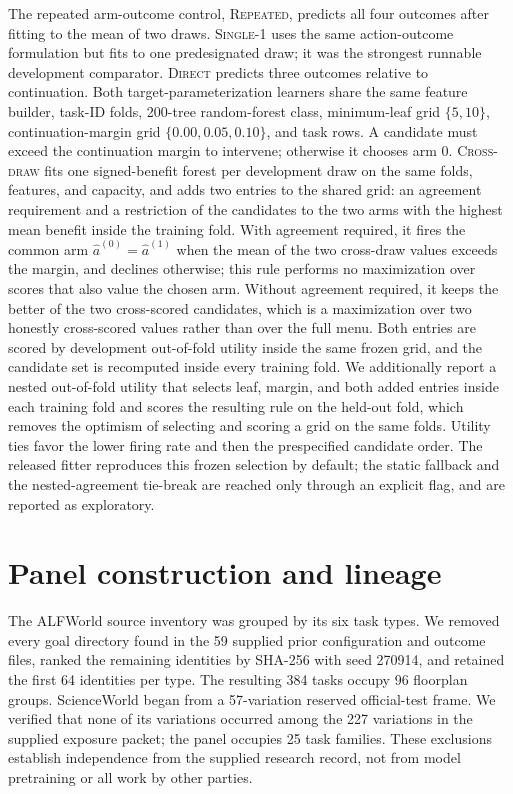 The repeated arm-outcome control, \textsc{Repeated}, predicts all four outcomes after fitting to the mean of two draws. \textsc{Single-1} uses the same action-outcome formulation but fits to one predesignated draw; it was the strongest runnable development comparator. \textsc{Direct} predicts three outcomes relative to continuation. Both target-parameterization learners share the same feature builder, task-ID folds, 200-tree random-forest class, minimum-leaf grid $\{5,10\}$, continuation-margin grid $\{0.00,0.05,0.10\}$, and task rows. A candidate must exceed the continuation margin to intervene; otherwise it chooses arm 0. \textsc{Cross-draw} fits one signed-benefit forest per development draw on the same folds, features, and capacity, and adds two entries to the shared grid: an agreement requirement and a restriction of the candidates to the two arms with the highest mean benefit inside the training fold. With agreement required, it fires the common arm $\widehat a^{(0)}=\widehat a^{(1)}$ when the mean of the two cross-draw values exceeds the margin, and declines otherwise; this rule performs no maximization over scores that also value the chosen arm. Without agreement required, it keeps the better of the two cross-scored candidates, which is a maximization over two honestly cross-scored values rather than over the full menu. Both entries are scored by development out-of-fold utility inside the same frozen grid, and the candidate set is recomputed inside every training fold. We additionally report a nested out-of-fold utility that selects leaf, margin, and both added entries inside each training fold and scores the resulting rule on the held-out fold, which removes the optimism of selecting and scoring a grid on the same folds. Utility ties favor the lower firing rate and then the prespecified candidate order. The released fitter reproduces this frozen selection by default; the static fallback and the nested-agreement tie-break are reached only through an explicit flag, and are reported as exploratory.

\section{Panel construction and lineage}
\label{app:lineage}

The ALFWorld source inventory was grouped by its six task types. We removed every goal directory found in the 59 supplied prior configuration and outcome files, ranked the remaining identities by SHA-256 with seed 270914, and retained the first 64 identities per type. The resulting 384 tasks occupy 96 floorplan groups. ScienceWorld began from a 57-variation reserved official-test frame. We verified that none of its variations occurred among the 227 variations in the supplied exposure packet; the panel occupies 25 task families. These exclusions establish independence from the supplied research record, not from model pretraining or all work by other parties.

